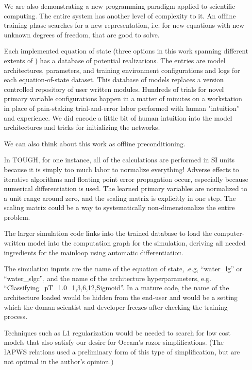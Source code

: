 \documentclass[]{article}
\begin{document}
We are also demonstrating a new programming paradigm applied to
scientific computing. The entire system has another level of complexity
to it. An offline training phase searches for a new representation, i.e.
for new equations with new unknown degrees of freedom, that are good to
solve.

Each implemented equation of state (three options in this work spanning
different extents of ) has a database of potential realizations.
The entries are model architectures, parameters, and training
environment configurations and logs for each equation-of-state dataset.
This database of models replaces a version controlled repository of user
written modules. Hundreds of trials for novel primary variable
configurations happen in a matter of minutes on a workstation in place
of pain-staking trial-and-error labor performed with human "intuition"
and experience. We did encode a little bit of human intuition into the
model architectures and tricks for initializing the networks.

We can also think about this work as offline preconditioning.

In TOUGH, for one instance, all of the calculations are performed in SI units because it is simply too much labor to normalize everything! Adverse effects to iterative algorithms and floating point error propagation occur, especially because numerical differentiation is used.
The learned primary variables are normalized to a unit range around zero, and the scaling matrix is explicitly in one step. The scaling matrix could be a way to systematically non-dimensionalize the entire problem.

The larger simulation code links into the trained database to load the
computer-written model into the computation graph for the simulation,
deriving all needed ingredients for the mainloop using automatic
differentiation.

The simulation inputs are the name of the equation of state, .e.g,
``water\_lg'' or ``water\_slgc'', and the name of the architecture
hyperparameters, e.g. ``Classifying\_pT\_1.0\_1,3,6,12,Sigmoid''.
In a mature code, the name of the architecture loaded would be hidden
from the end-user and would be a setting which the doman scientist and developer freezes
after checking the training process.

Techniques such as L1 regularization would be needed to search for low
cost models that also satisfy our desire for Occam's razor
simplifications. (The IAPWS relations used a preliminary form of this
type of simplification, but are not optimal in the author's opinion.)
\end{document}
